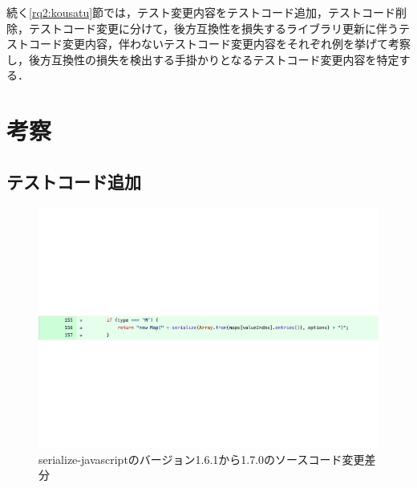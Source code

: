\documentclass[11pt,dvipdfmx]{jreport}
\begin{document}
続く\ref{rq2:kousatu}節では，テスト変更内容をテストコード追加，テストコード削除，テストコード変更に分けて，後方互換性を損失するライブラリ更新に伴うテストコード変更内容，伴わないテストコード変更内容をそれぞれ例を挙げて考察し，後方互換性の損失を検出する手掛かりとなるテストコード変更内容を特定する．

\section{考察}\label{sec:rq1.kousatu}

\subsection{テストコード追加}\label{subsec:add-test}

\begin{figure}[t]
  \centering
  \includegraphics[width=1.0\linewidth]{fig/rq1/set-map/map.pdf}
  \caption{serialize-javascriptのバージョン1.6.1から1.7.0のソースコード変更差分}
  \label{fig:rq1.insert-test-src}
\end{figure}
\end{document}
